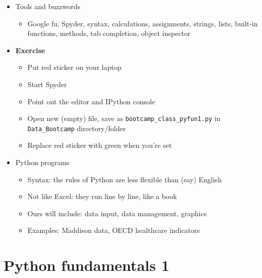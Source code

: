 \documentclass[11pt]{article}
\begin{document}
\begin{itemize}

\item Tools and buzzwords
\begin{itemize}
\item Google fu, Spyder, syntax, calculations, assignments, strings, lists, built-in functions, methods, tab completion, object inspector
\end{itemize}

\item {\bf Exercise}
\begin{itemize}
\item Put red sticker on your laptop
\item Start Spyder
\item Point out the editor and IPython console
\item Open new (empty) file, save as \verb|bootcamp_class_pyfun1.py| in \verb|Data_Bootcamp| directory/folder
\item Replace red sticker with green when you're set
\end{itemize}


\item Python programs
\begin{itemize}
\item Syntax:  the rules of Python are less flexible than (say) English
\item Not like Excel: they run line by line, like a book
\item Ours will include:  data input, data management, graphics
\item Examples:  Maddison data, OECD healthcare indicators
\end{itemize}
\end{itemize}


\section*{Python fundamentals 1}
\end{document}
